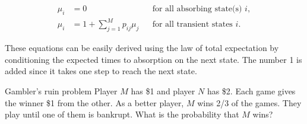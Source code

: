\[
\begin{aligned}
\mu_i&=0 &&\text{for all absorbing state(s) }i,\\
\mu_i&=1+\sum_{j=1}^{M}p_{ij}\mu_j
&&\text{for all transient states }i.
\end{aligned}
\]

These equations can be easily derived using the law of total expectation by conditioning
the expected times to absorption on the next state. The number 1 is added since it takes
one step to reach the next state.

\begin{problem}{Gambler's ruin problem}
Player $M$ has \$1 and player $N$ has \$2. Each game gives the winner \$1 from the other.
As a better player, $M$ wins 2/3 of the games. They play until one of them is bankrupt.
What is the probability that $M$ wins?
\end{problem}

